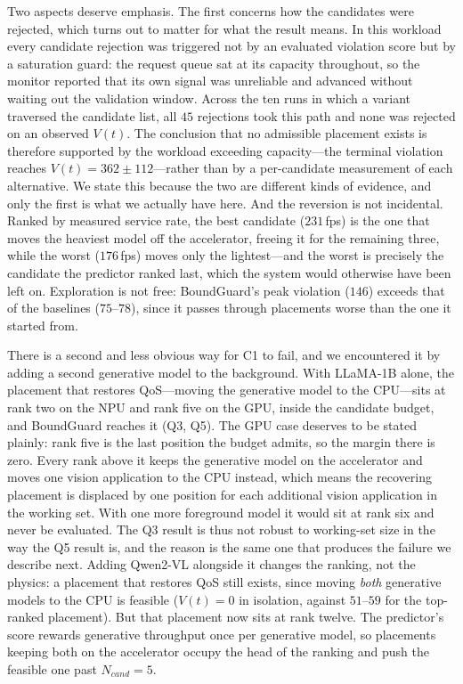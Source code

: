 \documentclass[conference]{IEEEtran}
\begin{document}
{{Two aspects deserve emphasis. \textcolor{navyblue}{The first concerns how the candidates were rejected, which turns out to matter for what the result means. In this workload every candidate rejection was triggered not by an evaluated violation score but by a saturation guard: the request queue sat at its capacity throughout, so the monitor reported that its own signal was unreliable and advanced without waiting out the validation window. Across the ten runs in which a variant traversed the candidate list, all $45$ rejections took this path and none was rejected on an observed $V(t)$. The conclusion that no admissible placement exists is therefore supported by the workload exceeding capacity---the terminal violation reaches $V(t)=362\pm112$---rather than by a per-candidate measurement of each alternative. We state this because the two are different kinds of evidence, and only the first is what we actually have here.} And the reversion is not incidental. Ranked by measured service rate, the best candidate ($231$\,fps) is the one that moves the heaviest model off the accelerator, freeing it for the remaining three, while the worst ($176$\,fps) moves only the lightest---and the worst is precisely the candidate the predictor ranked last, which the system would otherwise have been left on. Exploration is not free: BoundGuard's peak violation ($146$) exceeds that of the baselines ($75$--$78$), since it passes through placements worse than the one it started from.

There is a second and less obvious way for C1 to fail, and we encountered it by adding a second generative model to the background. With LLaMA-1B alone, the placement that restores QoS---moving the generative model to the CPU---sits at rank two on the NPU and rank five on the GPU, inside the candidate budget, and BoundGuard reaches it (Q3, Q5). \textcolor{navyblue}{The GPU case deserves to be stated plainly: rank five is the last position the budget admits, so the margin there is zero. Every rank above it keeps the generative model on the accelerator and moves one vision application to the CPU instead, which means the recovering placement is displaced by one position for each additional vision application in the working set. With one more foreground model it would sit at rank six and never be evaluated. The Q3 result is thus not robust to working-set size in the way the Q5 result is, and the reason is the same one that produces the failure we describe next.} Adding Qwen2-VL alongside it changes the ranking, not the physics: a placement that restores QoS still exists, since moving \emph{both} generative models to the CPU is feasible ($V(t)=0$ in isolation, against $51$--$59$ for the top-ranked placement). But that placement now sits at rank twelve. The predictor's score rewards generative throughput once per generative model, so placements keeping both on the accelerator occupy the head of the ranking and push the feasible one past $N_{cand}=5$.

}}
\end{document}

